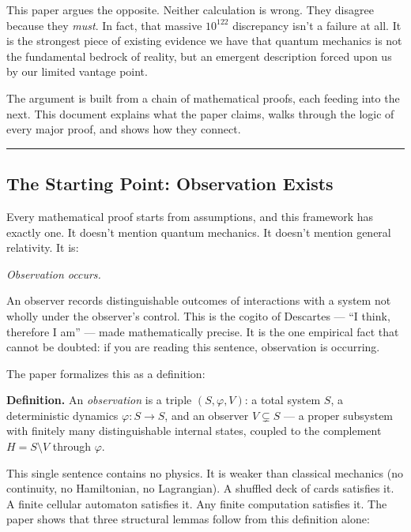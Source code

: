 \documentclass[
]{article}
\begin{document}
This paper argues the opposite. Neither calculation is wrong. They
disagree because they \emph{must}. In fact, that massive \(10^{122}\)
discrepancy isn't a failure at all. It is the strongest piece of
existing evidence we have that quantum mechanics is not the fundamental
bedrock of reality, but an emergent description forced upon us by our
limited vantage point.

The argument is built from a chain of mathematical proofs, each feeding
into the next. This document explains what the paper claims, walks
through the logic of every major proof, and shows how they connect.

\begin{center}\rule{0.5\linewidth}{0.5pt}\end{center}

\hypertarget{the-starting-point-observation-exists}{%
\subsection{The Starting Point: Observation
Exists}\label{the-starting-point-observation-exists}}

Every mathematical proof starts from assumptions, and this framework has
exactly one. It doesn't mention quantum mechanics. It doesn't mention
general relativity. It is:

\emph{Observation occurs.}

An observer records distinguishable outcomes of interactions with a
system not wholly under the observer's control. This is the cogito of
Descartes --- ``I think, therefore I am'' --- made mathematically
precise. It is the one empirical fact that cannot be doubted: if you are
reading this sentence, observation is occurring.

The paper formalizes this as a definition:

\textbf{Definition.} An \emph{observation} is a triple
\((S, \varphi, V)\): a total system \(S\), a deterministic dynamics
\(\varphi: S \to S\), and an observer \(V \subsetneq S\) --- a proper
subsystem with finitely many distinguishable internal states, coupled to
the complement \(H = S \setminus V\) through \(\varphi\).

This single sentence contains no physics. It is weaker than classical
mechanics (no continuity, no Hamiltonian, no Lagrangian). A shuffled
deck of cards satisfies it. A finite cellular automaton satisfies it.
Any finite computation satisfies it. The paper shows that three
structural lemmas follow from this definition alone:
\end{document}

